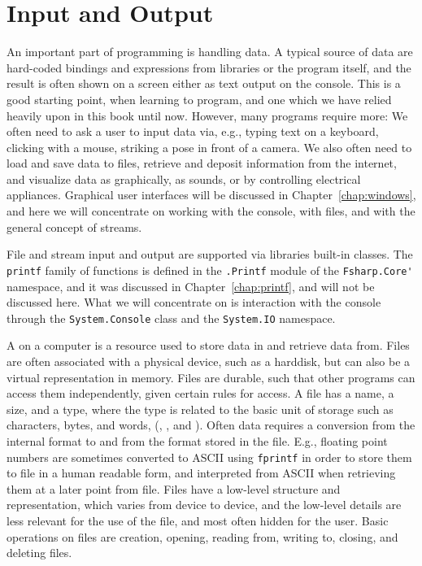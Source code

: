 \chapter{Input and Output}
\label{chap:IO}
An important part of programming is handling data. A typical source of data are hard-coded bindings and expressions from libraries or the program itself, and the result is often shown on a screen either as text output on the console. This is a good starting point, when learning to program, and one which we have relied heavily upon in this book until now. However, many programs require more: We often need to ask a user to input data via, e.g., typing text on a keyboard, clicking with a mouse, striking a pose in front of a camera. We also often need to load and save data to files, retrieve and deposit information from the internet, and visualize data as graphically, as sounds, or by controlling electrical appliances. Graphical user interfaces will be discussed in Chapter~\ref{chap:windows}, and here we will concentrate on working with the console, with files, and with the general concept of streams. 

File and stream input and output are supported via libraries built-in classes. The \lstinline!printf! family of functions is defined in the \lstinline!.Printf! module of the \lstinline!Fsharp.Core'! namespace, and it was discussed in Chapter~\ref{chap:printf}, and will not be discussed here. What we will concentrate on is interaction with the console through the \lstinline!System.Console! class and the \lstinline!System.IO! namespace.

A  on a computer is a resource used to store data in and retrieve data from. Files are often associated with a physical device, such as a harddisk, but can also be a virtual representation in memory. Files are durable, such that other programs can access them independently, given certain rules for access. A file has a name, a size, and a type, where the type is related to the basic unit of storage such as characters, bytes, and words, (, , and ). Often data requires a conversion from the internal format to and from the format stored in the file. E.g., floating point numbers are sometimes converted to ASCII using \lstinline!fprintf! in order to store them to file in a human readable form, and interpreted from ASCII when retrieving them at a later point from file. Files have a low-level structure and representation, which varies from device to device, and the low-level details are less relevant for the use of the file, and most often hidden for the user. Basic operations on files are creation, opening, reading from, writing to, closing, and deleting files.

